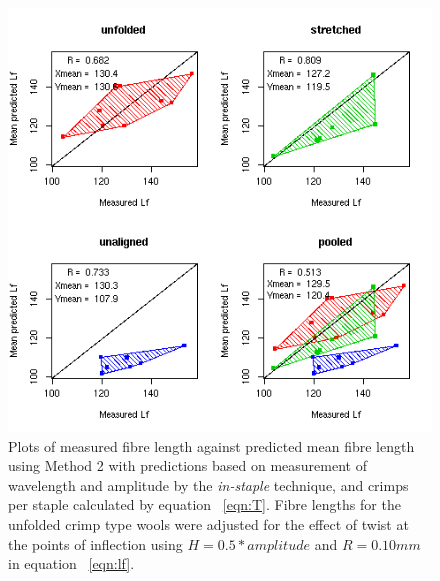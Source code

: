 %

\begin{figure}[!h]
  \centering
  \includegraphics[width=1.1\textwidth]{figispredlf.png}
  \caption{Plots of measured fibre length against predicted mean fibre length using Method 2 with predictions based on measurement of wavelength and amplitude by the {\em in-staple} technique, and crimps per staple calculated by equation ~\ref{eqn:T}. Fibre lengths for the unfolded crimp type wools were adjusted for the effect of twist at the points of inflection using $H = 0.5 * amplitude$ and $R = 0.10 mm$ in equation ~\ref{eqn:lf}.}
  \label{fig:ispredlf}
\end{figure}

%

